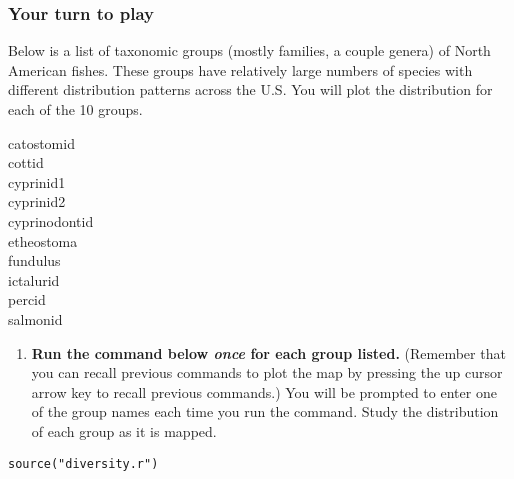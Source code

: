 \documentclass[11pt]{article}
\begin{document}
\subsubsection*{Your turn to play}

Below is a list of taxonomic groups (mostly families, a couple genera) of North American fishes.  These groups
have relatively large numbers of species with different distribution
patterns across the U.S. You will plot the distribution for each of the 10 groups.

\begin{multicols}{2}
catostomid \\
cottid \\
cyprinid1 \\
cyprinid2 \\
cyprinodontid \\
etheostoma \\
fundulus \\
ictalurid \\
percid \\
salmonid
\end{multicols}

\begin{enumerate}[resume]
\item \textbf{Run the command below \emph{once} for each group listed.} (Remember that you can recall
previous commands to plot the map by pressing the up cursor
arrow key to recall previous commands.) You will be prompted to enter one of the group names each time you run the command. Study the distribution of each group as it is mapped.
\end{enumerate}

\begin{verbatim}
source("diversity.r")
\end{verbatim}
\end{document}
